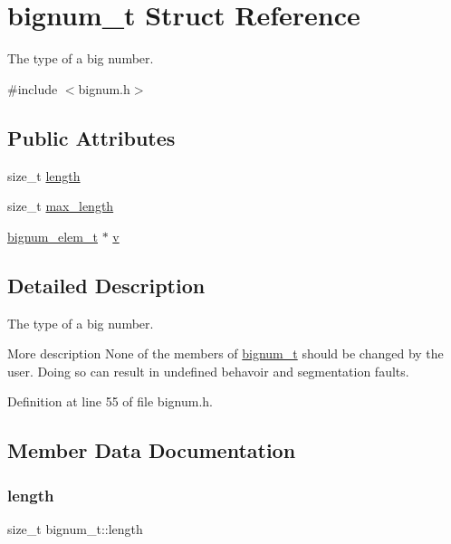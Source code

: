 \hypertarget{structbignum__t}{}\section{bignum\+\_\+t Struct Reference}
\label{structbignum__t}


The type of a big number.  




{\ttfamily \#include $<$bignum.\+h$>$}

\subsection*{Public Attributes}
\begin{DoxyCompactItemize}
\item 
size\+\_\+t \hyperlink{structbignum__t_af31e566ed4fced333a9bda01bf8648ca}{length}
\item 
size\+\_\+t \hyperlink{structbignum__t_a04a8be2cd406e93b255453a89907e578}{max\+\_\+length}
\item 
\hyperlink{bignum_8h_ac19e9b7c8236cb1d9e8b4bf16d0ce513}{bignum\+\_\+elem\+\_\+t} $\ast$ \hyperlink{structbignum__t_a1b6bf900c7f36fd981ba7de0adc8a771}{v}
\end{DoxyCompactItemize}


\subsection{Detailed Description}
The type of a big number. 

More description  None of the members of \hyperlink{structbignum__t}{bignum\+\_\+t} should be changed by the user. Doing so can result in undefined behavoir and segmentation faults. 

Definition at line 55 of file bignum.\+h.



\subsection{Member Data Documentation}
\mbox{\label{structbignum__t_af31e566ed4fced333a9bda01bf8648ca}} 
\subsubsection{\texorpdfstring{length}{length}}
{\footnotesize\ttfamily size\+\_\+t bignum\+\_\+t\+::length}

